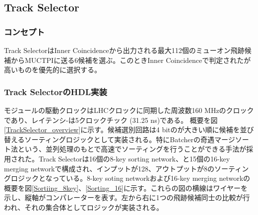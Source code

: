 \subsection{Track Selector}
\subsubsection*{コンセプト}
Track SelectorはInner Coincidenceから出力される最大112個のミューオン飛跡候補からMUCTPIに送る6候補を選ぶ。このときInner Coincidenceで判定された\pt が高いものを優先的に選択する。

\subsubsection*{Track SelectorのHDL実装}
モジュールの駆動クロックはLHCクロックに同期した周波数160 MHzのクロックであり、レイテンシ-は5クロックチック (31.25 ns)である。
概要を図\ref{TrackSelector_overview}に示す。候補選別回路は4 bitの\pt が大きい順に候補を並び替えるソーティングロジックとして実装される。特にBatcherの奇遇マージソート法\cite{Batcher}という、並列処理のもとで高速でソーティングを行うことができる手法が採用された。Track Selectorは16個の8-key sorting network、と15個の16-key merging networkで構成され、インプットが128、アウトプットが8のソーティングロジックとなっている。8-key soting networkおよび16-key merging networkの概要を図\ref{Sortiing_8key}、\ref{Sorting_16}に示す。これらの図の横線はワイヤーを示し、縦軸がコンパレーターを表す。左から右に1つの飛跡候補同士の比較が行われ、それの集合体としてロジックが実装される。


